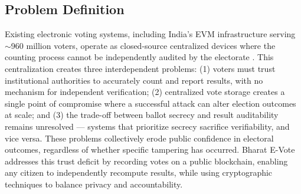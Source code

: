 \documentclass[oneside,a4paper,12pt]{book}
\begin{document}
\subsection{Problem Definition}
Existing electronic voting systems, including India's EVM infrastructure serving $\sim$960 million voters, operate as closed-source centralized devices where the counting process cannot be independently audited by the electorate \cite{eci2024}. This centralization creates three interdependent problems: (1) voters must trust institutional authorities to accurately count and report results, with no mechanism for independent verification; (2) centralized vote storage creates a single point of compromise where a successful attack can alter election outcomes at scale; and (3) the trade-off between ballot secrecy and result auditability remains unresolved --- systems that prioritize secrecy sacrifice verifiability, and vice versa. These problems collectively erode public confidence in electoral outcomes, regardless of whether specific tampering has occurred. Bharat E-Vote addresses this trust deficit by recording votes on a public blockchain, enabling any citizen to independently recompute results, while using cryptographic techniques to balance privacy and accountability.
\end{document}

